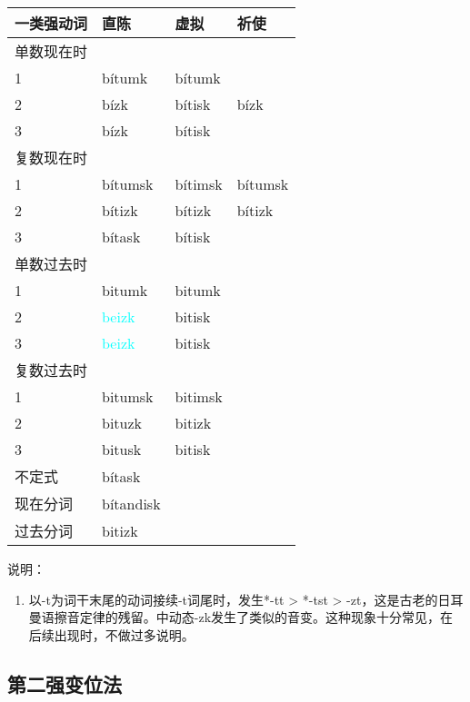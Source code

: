 \begin{longtable}{llll}
    \toprule
    一类强动词 & 直陈      & 虚拟    & 祈使    \\
    \midrule
    \endhead
    \bottomrule
    \endfoot
    单数现在时 &           &         &         \\
    1          & bítumk    & bítumk  &         \\
    2          & bízk      & bítisk  & bízk    \\
    3          & bízk      & bítisk  &         \\
    复数现在时 &           &         &         \\
    1          & bítumsk   & bítimsk & bítumsk \\
    2          & bítizk    & bítizk  & bítizk  \\
    3          & bítask    & bítisk  &         \\
    单数过去时 &           &         &         \\
    1          & bitumk    & bitumk  &         \\
    2          & \textcolor{cyan}{beizk}     & bitisk  &         \\
    3          & \textcolor{cyan}{beizk}     & bitisk  &         \\
    复数过去时 &           &         &         \\
    1          & bitumsk   & bitimsk &         \\
    2          & bituzk    & bitizk  &         \\
    3          & bitusk    & bitisk  &         \\
    不定式     & bítask    &         &         \\
    现在分词   & bítandisk &         &         \\
    过去分词   & bitizk    &         &         \\
\end{longtable}

说明：

\begin{enumerate}
    \item
          以-t为词干末尾的动词接续-t词尾时，发生*-tt > *-tst
          >
          -zt，这是古老的日耳曼语擦音定律的残留。中动态-zk发生了类似的音变。这种现象十分常见，在后续出现时，不做过多说明。
\end{enumerate}

\subsection{第二强变位法}\label{第二强变位法}

